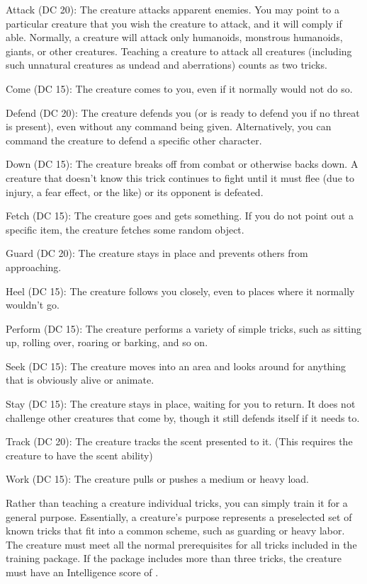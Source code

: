\par Attack (DC 20): The creature attacks apparent enemies. You may point to a particular creature that you wish the creature to attack, and it will comply if able. Normally, a creature will attack only humanoids, monstrous humanoids, giants, or other creatures. Teaching a creature to attack all creatures (including such unnatural creatures as undead and aberrations) counts as two tricks.
\par Come (DC 15): The creature comes to you, even if it normally would not do so.
\par Defend (DC 20): The creature defends you (or is ready to defend you if no threat is present), even without any command being given. Alternatively, you can command the creature to defend a specific other character.
\par Down (DC 15): The creature breaks off from combat or otherwise backs down. A creature that doesn't know this trick continues to fight until it must flee (due to injury, a fear effect, or the like) or its opponent is defeated.
\par Fetch (DC 15): The creature goes and gets something. If you do not point out a specific item, the creature fetches some random object.
\par Guard (DC 20): The creature stays in place and prevents others from approaching.
\par Heel (DC 15): The creature follows you closely, even to places where it normally wouldn't go.
\par Perform (DC 15): The creature performs a variety of simple tricks, such as sitting up, rolling over, roaring or barking, and so on.
\par Seek (DC 15): The creature moves into an area and looks around for anything that is obviously alive or animate.
\par Stay (DC 15): The creature stays in place, waiting for you to return. It does not challenge other creatures that come by,
though it still defends itself if it needs to.
\par Track (DC 20): The creature tracks the scent presented to it. (This requires the creature to have the scent ability)
\par Work (DC 15): The creature pulls or pushes a medium or heavy load.

 Rather than teaching a creature individual tricks, you can simply train it for a general purpose. Essentially, a creature's purpose represents a preselected set of known tricks that fit into a common scheme, such as guarding or heavy labor. The creature must meet all the normal prerequisites for all tricks included in the training package. If the package includes more than three tricks, the creature must have an Intelligence score of .

